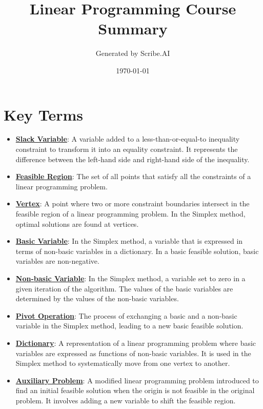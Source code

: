 \documentclass{article}%
\title{Linear Programming Course Summary}%
\author{Generated by Scribe.AI}%
\date{\today}%
\begin{document}
%
\normalsize%
\maketitle%
\section{Key Terms}%
\label{sec:KeyTerms}%
\begin{itemize}[leftmargin=*]%
\item \href{https://www.math.purdue.edu/~yipn/421/2024-08-27-ExSimplex.pdf#page=1}{\textbf{Slack Variable}}: A variable added to a less-than-or-equal-to inequality constraint to transform it into an equality constraint. It represents the difference between the left-hand side and right-hand side of the inequality.%
\item \href{https://www.math.purdue.edu/~yipn/421/2024-08-27-ExSimplex.pdf#page=4}{\textbf{Feasible Region}}: The set of all points that satisfy all the constraints of a linear programming problem.%
\item \href{https://www.math.purdue.edu/~yipn/421/2024-08-27-ExSimplex.pdf#page=5}{\textbf{Vertex}}: A point where two or more constraint boundaries intersect in the feasible region of a linear programming problem. In the Simplex method, optimal solutions are found at vertices.%
\item \href{https://www.math.purdue.edu/~yipn/421/2024-08-27-ExSimplex.pdf#page=6}{\textbf{Basic Variable}}: In the Simplex method, a variable that is expressed in terms of non-basic variables in a dictionary. In a basic feasible solution, basic variables are non-negative.%
\item \href{https://www.math.purdue.edu/~yipn/421/2024-08-27-ExSimplex.pdf#page=6}{\textbf{Non{-}basic Variable}}: In the Simplex method, a variable set to zero in a given iteration of the algorithm. The values of the basic variables are determined by the values of the non-basic variables.%
\item \href{https://www.math.purdue.edu/~yipn/421/2024-08-27-ExSimplex.pdf#page=9}{\textbf{Pivot Operation}}: The process of exchanging a basic and a non-basic variable in the Simplex method, leading to a new basic feasible solution.%
\item \href{https://www.math.purdue.edu/~yipn/421/2024-08-27-ExSimplex.pdf#page=26}{\textbf{Dictionary}}: A representation of a linear programming problem where basic variables are expressed as functions of non-basic variables. It is used in the Simplex method to systematically move from one vertex to another.%
\item \href{https://www.math.purdue.edu/~yipn/421/2024-08-27-ExSimplex.pdf#page=32}{\textbf{Auxiliary Problem}}: A modified linear programming problem introduced to find an initial feasible solution when the origin is not feasible in the original problem. It involves adding a new variable to shift the feasible region.%
\end{itemize}%
\end{document}
